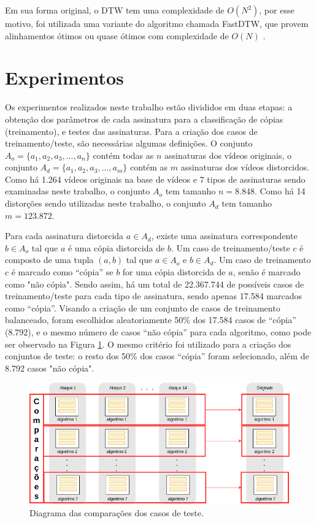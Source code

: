 
Em sua forma original, o DTW tem uma complexidade de $ O(N^{2}) $, por esse motivo, foi utilizada uma variante do algoritmo chamada FastDTW, que provem alinhamentos ótimos ou quase ótimos com complexidade de $O(N)$ \cite{salvador2007toward}.


\section{Experimentos}
\label{sec:met-Experimentos}

Os experimentos realizados neste trabalho estão divididos em duas etapas: a obtenção dos parâmetros de cada assinatura para a classificação de cópias (treinamento), e testes das assinaturas. Para a criação dos casos de treinamento/teste, são necessárias algumas definições. O conjunto $A_o = \{a_1, a_2, a_3, ..., a_n\}$ contém todas as $n$ assinaturas dos vídeos originais, o conjunto $A_d = \{a_1, a_2, a_3, ..., a_m\}$ contém as $m$ assinaturas dos vídeos distorcidos. Como há 1.264 vídeos originais na base de vídeos e 7 tipos de assinaturas sendo examinadas neste trabalho, o conjunto $A_o$ tem tamanho $n=8.848$. Como há 14 distorções sendo utilizadas neste trabalho, o conjunto $A_d$ tem tamanho $m=123.872$.

Para cada assinatura distorcida $a \in A_d$, existe uma assinatura correspondente $b \in A_o$ tal que $a$ é uma cópia distorcida de $b$. Um caso de treinamento/teste $c$ é composto de uma tupla $(a, b)$ tal que $a \in A_o$ e $b \in A_d$. Um caso de treinamento $c$ é marcado como ``cópia'' se $b$ for uma cópia distorcida de $a$, senão é marcado como "não cópia". Sendo assim, há um total de 22.367.744 de possíveis casos de treinamento/teste para cada tipo de assinatura, sendo apenas 17.584 marcados como ``cópia''. Visando a criação de um conjunto de casos de treinamento balanceado, foram escolhidos aleatoriamente 50\% dos 17.584 casos de ``cópia'' (8.792), e o mesmo número de casos ``não cópia'' para cada algoritmo, como pode ser observado na Figura \ref{fig:comparacao}. O mesmo critério foi utilizado para a criação dos conjuntos de teste: o resto dos 50\% dos casos ``cópia'' foram selecionado, além de 8.792 casos "não cópia".

\begin{figure}[h]
    \centering
    \caption{Diagrama das comparações dos casos de teste.}
    \label{fig:comparacao}
    \includegraphics[width=1.0\textwidth]{dados/figuras/Comparador-1}
\end{figure}

